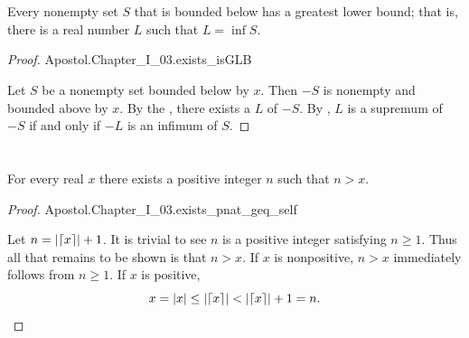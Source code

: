 \documentclass{report}
\begin{document}
\section{}%
\label{sec:theorem-i.27}

\begin{theorem}[I.27]

  Every nonempty set $S$ that is bounded below has a greatest lower bound; that
    is, there is a real number $L$ such that $L = \inf{S}$.

\end{theorem}

\begin{proof}

    {Apostol.Chapter\_I\_03.exists\_isGLB}

  Let $S$ be a nonempty set bounded below by $x$.
  Then $-S$ is nonempty and bounded above by $x$.
  By the , there exists a
     $L$ of $-S$.
  By , $L$ is a supremum of $-S$ if and only if $-L$ is an
    infimum of $S$.

\end{proof}

\section{}%
\label{sec:theorem-i.29}

\begin{theorem}[I.29]

  For every real $x$ there exists a positive integer $n$ such that $n > x$.

\end{theorem}

\begin{proof}

    {Apostol.Chapter\_I\_03.exists\_pnat\_geq\_self}

  Let $n = \left|\left\lceil x\right\rceil\right| + 1$.
  It is trivial to see $n$ is a positive integer satisfying $n \geq 1$.
  Thus all that remains to be shown is that $n > x$.
  If $x$ is nonpositive, $n > x$ immediately follows from $n \geq 1$.
  If $x$ is positive,
    $$x = \left|x\right| \leq \left|\left\lceil x\right\rceil\right| < \left|\left\lceil x\right\rceil\right| + 1 = n.$$

\end{proof}

\section{}%
\label{sec:archimedean-property-reals}
\label{sec:theorem-i.30}
\end{document}
